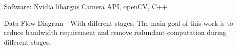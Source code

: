Software:
Nvidia libargus Camera API,
openCV, C++ \newline

Data Flow Diagram
- With different stages. The main goal of this work is to reduce bandwidth requirement and remove redundant computation during different stages. 



%
%
%
%
